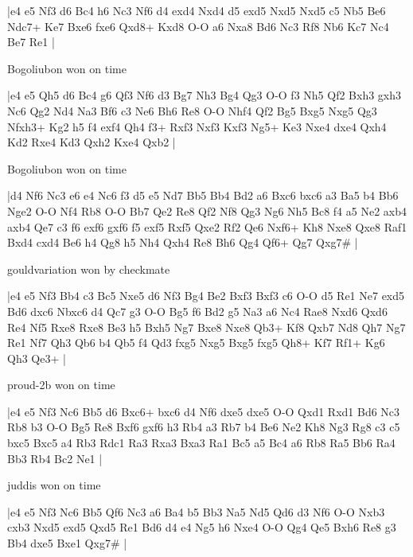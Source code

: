\makegametitle
|e4 e5 Nf3 d6 Bc4 h6 Nc3 Nf6 d4 exd4 Nxd4 d5 exd5 Nxd5 Nxd5 c5 Nb5 Be6 Ndc7+ Ke7 Bxe6 fxe6 Qxd8+ Kxd8 O-O a6 Nxa8 Bd6 Nc3 Rf8 Nb6 Kc7 Nc4 Be7 Re1  |

\showboard

Bogoliubon won on time

\makegametitle
|e4 e5 Qh5 d6 Bc4 g6 Qf3 Nf6 d3 Bg7 Nh3 Bg4 Qg3 O-O f3 Nh5 Qf2 Bxh3 gxh3 Nc6 Qg2 Nd4 Na3 Bf6 c3 Ne6 Bh6 Re8 O-O Nhf4 Qf2 Bg5 Bxg5 Nxg5 Qg3 Nfxh3+ Kg2 h5 f4 exf4 Qh4 f3+ Rxf3 Nxf3 Kxf3 Ng5+ Ke3 Nxe4 dxe4 Qxh4 Kd2 Rxe4 Kd3 Qxh2 Kxe4 Qxb2  |

\showboard

Bogoliubon won on time

\makegametitle
|d4 Nf6 Nc3 e6 e4 Nc6 f3 d5 e5 Nd7 Bb5 Bb4 Bd2 a6 Bxc6 bxc6 a3 Ba5 b4 Bb6 Nge2 O-O Nf4 Rb8 O-O Bb7 Qe2 Re8 Qf2 Nf8 Qg3 Ng6 Nh5 Bc8 f4 a5 Ne2 axb4 axb4 Qe7 c3 f6 exf6 gxf6 f5 exf5 Rxf5 Qxe2 Rf2 Qe6 Nxf6+ Kh8 Nxe8 Qxe8 Raf1 Bxd4 cxd4 Be6 h4 Qg8 h5 Nh4 Qxh4 Re8 Bh6 Qg4 Qf6+ Qg7 Qxg7\#  |

\showboard

gouldvariation won by checkmate

\makegametitle
|e4 e5 Nf3 Bb4 c3 Bc5 Nxe5 d6 Nf3 Bg4 Be2 Bxf3 Bxf3 c6 O-O d5 Re1 Ne7 exd5 Bd6 dxc6 Nbxc6 d4 Qc7 g3 O-O Bg5 f6 Bd2 g5 Na3 a6 Nc4 Rae8 Nxd6 Qxd6 Re4 Nf5 Rxe8 Rxe8 Be3 h5 Bxh5 Ng7 Bxe8 Nxe8 Qb3+ Kf8 Qxb7 Nd8 Qh7 Ng7 Re1 Nf7 Qh3 Qb6 b4 Qb5 f4 Qd3 fxg5 Nxg5 Bxg5 fxg5 Qh8+ Kf7 Rf1+ Kg6 Qh3 Qe3+  |

\showboard

proud-2b won on time

\makegametitle
|e4 e5 Nf3 Nc6 Bb5 d6 Bxc6+ bxc6 d4 Nf6 dxe5 dxe5 O-O Qxd1 Rxd1 Bd6 Nc3 Rb8 b3 O-O Bg5 Re8 Bxf6 gxf6 h3 Rb4 a3 Rb7 b4 Be6 Ne2 Kh8 Ng3 Rg8 c3 c5 bxc5 Bxc5 a4 Rb3 Rdc1 Ra3 Rxa3 Bxa3 Ra1 Bc5 a5 Bc4 a6 Rb8 Ra5 Bb6 Ra4 Bb3 Rb4 Bc2 Ne1  |

\showboard

juddis won on time

\makegametitle
|e4 e5 Nf3 Nc6 Bb5 Qf6 Nc3 a6 Ba4 b5 Bb3 Na5 Nd5 Qd6 d3 Nf6 O-O Nxb3 cxb3 Nxd5 exd5 Qxd5 Re1 Bd6 d4 e4 Ng5 h6 Nxe4 O-O Qg4 Qe5 Bxh6 Re8 g3 Bb4 dxe5 Bxe1 Qxg7\#  |

